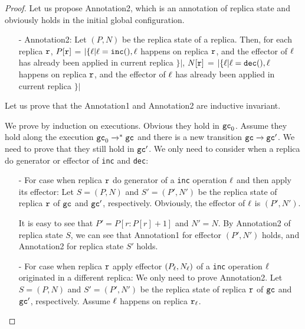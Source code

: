 \begin {proof}


Let us propose Annotation2, which is an annotation of replica state and obviously holds in the initial global configuration.

\begin{itemize}
\setlength{\itemsep}{0.5pt}
\item[-] Annotation2: Let $(P,N)$ be the replica state of a replica. Then, for each replica $\arep$, $P[\arep]$ =  $\vert \{ \alabel \vert \alabel = \alabelshort[{\tt inc}]{}, \alabel$ happens on replica $\arep$, and the effector of $\alabel$ has already been applied in current replica $\} \vert$,
    $N[\arep]$ =  $\vert \{ \alabel \vert \alabel = \alabelshort[{\tt dec}]{}, \alabel$ happens on replica $\arep$, and the effector of $\alabel$ has already been applied in current replica $\} \vert$
\end{itemize}


Let us prove that the Annotation1 and Annotation2 are inductive invariant.

We prove by induction on executions. Obvious they hold in $\aglobalstate_0$. Assume they hold along the execution $\aglobalstate_0 \xrightarrow{}^* \aglobalstate$ and there is a new transition $\aglobalstate \xrightarrow{} \aglobalstate'$. We need to prove that they still hold in $\aglobalstate'$. We only need to consider when a replica do generator or effector of {\tt inc} and {\tt dec}:

\begin{itemize}
\setlength{\itemsep}{0.5pt}
\item[-] For case when replica $\arep$ do generator of a {\tt inc} operation $\alabel$ and then apply its effector: Let $S=(P,N)$ and $S'=(P',N')$ be the replica state of replica $\arep$ of $\aglobalstate$ and $\aglobalstate'$, respectively. Obviously, the effector of $\alabel$ is $(P',N')$.

    It is easy to see that $P'=P[r:P[r]+1]$ and $N'=N$. By Annotation2 of replica state $S$, we can see that Annotation1 for effector $(P',N')$ holds, and Annotation2 for replica state $S'$ holds.

\item[-] For case when replica $\arep$ apply effector $(P_{\alabel},N_{\alabel})$ of a {\tt inc} operation $\alabel$ originated in a different replica: We only need to prove Annotation2. Let $S=(P,N)$ and $S'=(P',N')$ be the replica state of replica $\arep$ of $\aglobalstate$ and $\aglobalstate'$, respectively. Assume $\alabel$ happens on replica $\arep_{\alabel}$.


\end{itemize}
\end{proof}
